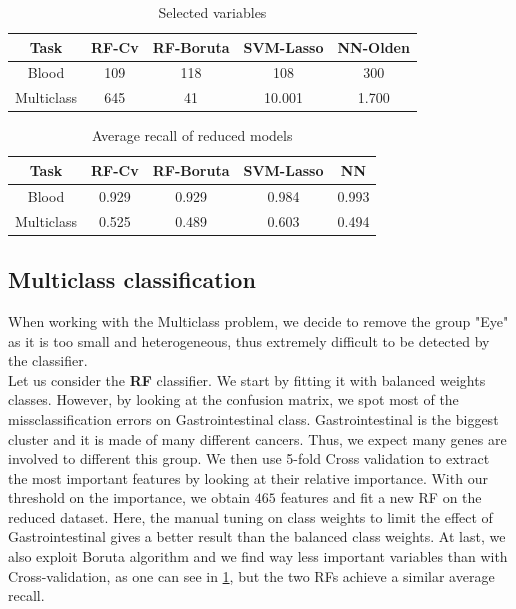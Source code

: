 \documentclass[a4paper,11pt, oneside]{article}  %
\begin{document}
\begin{table}[h!]
 \centering
 \begin{tabular}{c c c c c}
  \hline\hline
  Task & RF-Cv &  RF-Boruta & SVM-Lasso & NN-Olden \\ [0.5ex] %
  \hline
  Blood & 109 & 118 & 108 & 300 \\
  Multiclass & 645 &  41 & 10.001 & 1.700 \\ [1ex]
  \hline
 \end{tabular}
 \caption{Selected variables}
 \label{table:selected variables}
\end{table}

\begin{table}
 \centering
 \begin{tabular}{c c c c c}
  \hline\hline
  Task & RF-Cv & RF-Boruta & SVM-Lasso & NN \\ [0.5ex] %
  \hline
  Blood & 0.929 & 0.929 & 0.984 & 0.993 \\
  Multiclass & 0.525 & 0.489 & 0.603 & 0.494 \\ [1ex]
  \hline
 \end{tabular}
 \caption{Average recall of reduced models}
 \label{table:reduced_models}
\end{table}


\subsection{Multiclass classification}
When working with the Multiclass problem, we decide to remove the group "Eye" as it is too small and heterogeneous,  thus extremely difficult to be detected by the classifier.  \\

Let us consider the \textbf{RF}  classifier. We start by fitting it with balanced weights classes. However, by looking at the confusion matrix, we spot most of the missclassification errors on Gastrointestinal class. Gastrointestinal is the biggest cluster and it is made of many different cancers. Thus, we expect many genes are involved to different this group. We then use 5-fold Cross validation to extract the most important features by looking at their relative importance. With our threshold on the importance, we obtain $465$ features and fit a new RF on the reduced dataset. Here, the manual tuning on class weights to limit the effect of Gastrointestinal gives a better result than the balanced class weights. At last, we also exploit Boruta algorithm and we find way less important variables than with Cross-validation, as one can see in \ref{table:selected variables}, but the two RFs achieve a similar average recall.
\end{document}
